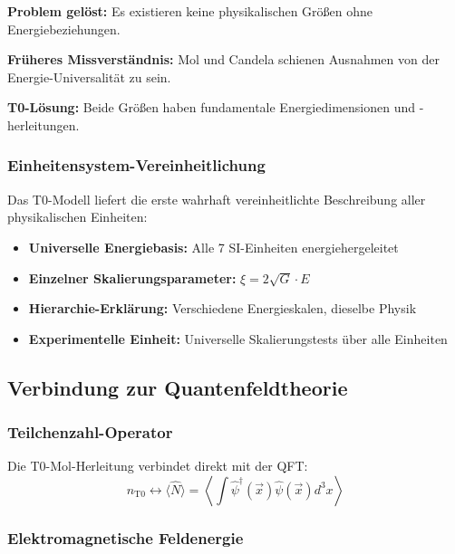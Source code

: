 \documentclass[12pt,a4paper]{article}
\newcommand{\xipar}{\xi}
\begin{document}
	\textbf{Problem gelöst:} Es existieren keine physikalischen Größen ohne Energiebeziehungen.
	
	\textbf{Früheres Missverständnis:} Mol und Candela schienen Ausnahmen von der Energie-Universalität zu sein.
	
	\textbf{T0-Lösung:} Beide Größen haben fundamentale Energiedimensionen und -herleitungen.
	
	\subsubsection{Einheitensystem-Vereinheitlichung}
	\label{subsubsec:einheitensystem_vereinheitlichung}
	
	Das T0-Modell liefert die erste wahrhaft vereinheitlichte Beschreibung aller physikalischen Einheiten:
	
	\begin{itemize}
		\item \textbf{Universelle Energiebasis:} Alle 7 SI-Einheiten energiehergeleitet
		\item \textbf{Einzelner Skalierungsparameter:} $\xipar = 2\sqrt{G} \cdot E$
		\item \textbf{Hierarchie-Erklärung:} Verschiedene Energieskalen, dieselbe Physik
		\item \textbf{Experimentelle Einheit:} Universelle Skalierungstests über alle Einheiten
	\end{itemize}
	
	\subsection{Verbindung zur Quantenfeldtheorie}
	\label{subsec:qft_verbindung}
	
	\subsubsection{Teilchenzahl-Operator}
	\label{subsubsec:teilchenzahl_operator}
	
	Die T0-Mol-Herleitung verbindet direkt mit der QFT:
	\begin{equation}
		n_{\text{T0}} \leftrightarrow \langle \hat{N} \rangle = \left\langle \int \hat{\psi}^\dagger(\vec{x}) \hat{\psi}(\vec{x}) d^3x \right\rangle
		\label{eq:mol_qft_verbindung}
	\end{equation}
	
	\subsubsection{Elektromagnetische Feldenergie}
	\label{subsubsec:em_feldenergie}
	
\end{document}
